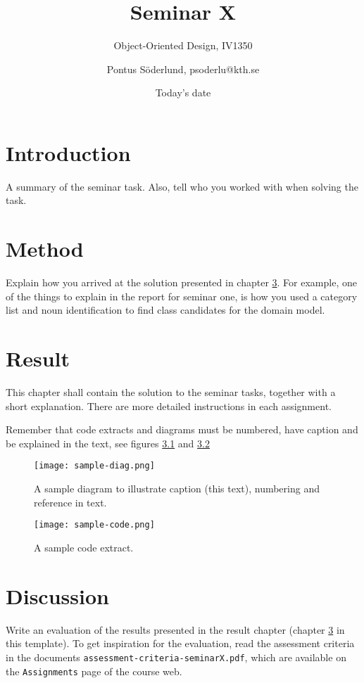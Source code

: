 \documentclass[a4paper]{scrreprt}
\title{Seminar X}
\subtitle{Object-Oriented Design, IV1350}
\author{Pontus Söderlund, psoderlu@kth.se}
\date{Today's date}
\begin{document}
\maketitle

\tableofcontents %

\chapter{Introduction}

A summary of the seminar task. Also, tell who you worked with when solving the task. 

\chapter{Method}

Explain how you arrived at the solution presented in chapter \ref{sec:result}. For example, one of the things to explain in the report for seminar one, is how you used a category list and noun identification to find class candidates for the domain model.

\chapter{Result}
\label{sec:result}

This chapter shall contain the solution to the seminar tasks, together with a short explanation. There are more detailed instructions in each assignment.

Remember that code extracts and diagrams must be numbered, have caption and be explained in the text, see figures \ref{fig:diag} and \ref{fig:code}

\begin{figure}[h!]
  \begin{center}
    \texttt{[image: sample-diag.png]}
    \caption{A sample diagram to illustrate caption (this text), numbering and reference in text.}
    \label{fig:diag}
  \end{center}
\end{figure}

\begin{figure}[h!]
  \begin{center}
    \texttt{[image: sample-code.png]}
    \caption{A sample code extract.}
    \label{fig:code}
  \end{center}
\end{figure}

\chapter{Discussion}

Write an evaluation of the results presented in the result chapter (chapter \ref{sec:result} in this template). To get inspiration for the evaluation, read the assessment criteria in the documents \texttt{assessment-criteria-seminarX.pdf}, which are available on the \texttt{Assignments} page of the course web.
\end{document}
